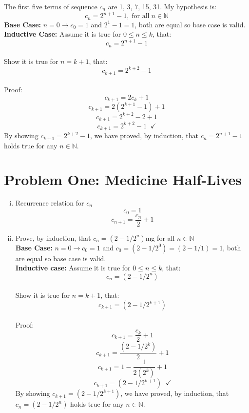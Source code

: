 \documentclass{article}
\begin{document}
\begin{enumerate}[i.]
    The first five terms of sequence $c_n$ are 1, 3, 7, 15, 31. My hypothesis is:
    $$c_n = 2^{n+1} - 1, \; \text{for all} \; n \in \mathbb{N}$$
    \textbf{Base Case:} $n = 0 \to c_0 = 1$ and $2^1 - 1 = 1$, both are equal so base case is valid.
    \\\textbf{Inductive Case:} Assume it is true for $0 \leqslant n \leqslant k$, that:
    $$c_n = 2^{n+1} - 1$$
    \\Show it is true for $n = k + 1$, that:
    $$c_{k+1} = 2^{k+2} - 1$$
    \\Proof:
    $$c_{k+1} = 2c_k + 1$$
    $$c_{k+1} = 2(2^{k+1} - 1) + 1$$
    $$c_{k+1} = 2^{k+2} - 2 + 1$$
    $$c_{k+1} = 2^{k+2} - 1 \;\;\checkmark$$
    By showing $c_{k+1} = 2^{k+2} - 1$, we have proved, by induction, that $c_n = 2^{n+1} - 1$ holds true for any $n \in \mathbb{N}$.
\end{enumerate}

\section*{Problem One: Medicine Half-Lives}
\begin{enumerate}[i.]
    \item Recurrence relation for $c_n$
    $$c_0 = 1$$
    $$c_{n+1} = \frac{c_n}{2} + 1$$
    
    \item Prove, by induction, that $c_n = (2 - 1/2^n)$mg for all $n \in \mathbb{N}$ 
    \\\textbf{Base Case:} $n = 0 \to c_0 = 1$ and $c_0 = (2 - 1/2^0) = (2 - 1/1) = 1$, both are equal so base case is valid.
    \\\textbf{Inductive case:} Assume it is true for $0 \leqslant n \leqslant k$, that:
    $$c_n = (2 - 1/2^n)$$
    \\Show it is true for $n = k + 1$, that:
    $$c_{k+1} = (2 - 1/2^{k+1})$$
    \\Proof:
    $$c_{k+1} = \frac{c_k}{2} + 1$$
    $$c_{k+1} = \frac{(2 - 1/2^k)}{2} + 1$$
    $$c_{k+1} = 1 - \frac{1}{2(2^k)} + 1$$
    $$c_{k+1} = (2 - 1/2^{k+1}) \;\;\checkmark$$
    By showing $c_{k+1} = (2 - 1/2^{k+1})$, we have proved, by induction, that $c_n = (2 - 1/2^{n})$ holds true for any $n \in \mathbb{N}$.
\end{enumerate}
\end{document}
